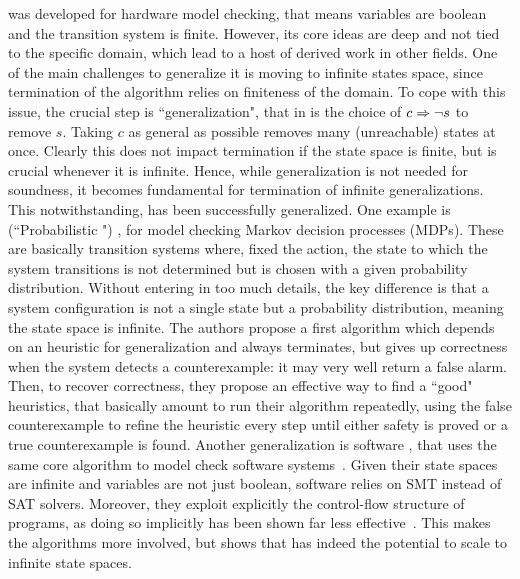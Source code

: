  was developed for hardware model checking, that means variables are boolean and the transition system is finite. However, its core ideas are deep and not tied to the specific domain, which lead to a host of derived work in other fields. One of the main challenges to generalize it is moving to infinite states space, since termination of the algorithm relies on finiteness of the domain. To cope with this issue, the crucial step is ``generalization", that in  is the choice of $c \Rightarrow \lnot s$ to remove $s$. Taking $c$ as general as possible removes many (unreachable) states at once. Clearly this does not impact termination if the state space is finite, but is crucial whenever it is infinite. Hence, while generalization is not needed for soundness, it becomes fundamental for termination of infinite generalizations.
This notwithstanding,  has been successfully generalized. One example is  (``Probabilistic ") \cite{BJKKMS20}, for model checking Markov decision processes (MDPs). These are basically transition systems where, fixed the action, the state to which the system transitions is not determined but is chosen with a given probability distribution. Without entering in too much details, the key difference is that a system configuration is not a single state but a probability distribution, meaning the state space is infinite. The authors propose a first algorithm which depends on an heuristic for generalization and always terminates, but gives up correctness when the system detects a counterexample: it may very well return a false alarm. Then, to recover correctness, they propose an effective way to find a ``good" heuristics, that basically amount to run their algorithm repeatedly, using the false counterexample to refine the heuristic every step until either safety is proved or a true counterexample is found.
Another generalization is software , that uses the same core algorithm to model check software systems~\cite{CG12,LNNK20}. Given their state spaces are infinite and variables are not just boolean, software  relies on SMT instead of SAT solvers. Moreover, they exploit explicitly the control-flow structure of programs, as doing so implicitly has been shown far less effective~\cite{CG12}. This makes the algorithms more involved, but shows that  has indeed the potential to scale to infinite state spaces.


